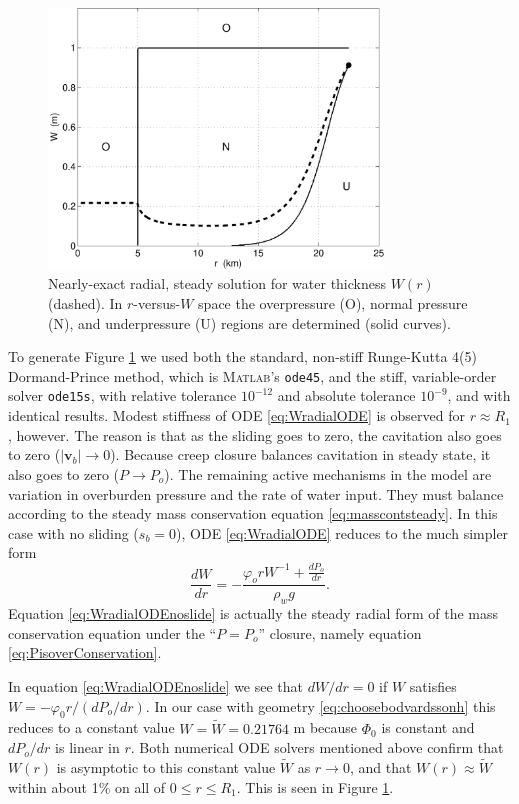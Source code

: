 \documentclass[11pt,final]{amsart}%
\newcommand\bv{\mathbf{v}}
\newcommand\Matlab{\textsc{Matlab}\xspace}
\begin{document}
\begin{figure}[ht]
\includegraphics[width=3.5in,keepaspectratio=true]{figs/exact-W-plot-onu}
\caption{Nearly-exact radial, steady solution for water thickness $W(r)$ (dashed).  In $r$-versus-$W$ space the overpressure (O), normal pressure (N), and underpressure (U) regions are determined (solid curves).}
\label{fig:Wexact}
\end{figure}

To generate Figure \ref{fig:Wexact} we used both the standard, non-stiff Runge-Kutta 4(5) Dormand-Prince method, which is \Matlab's \texttt{ode45}, and the stiff, variable-order solver \texttt{ode15s}, with relative tolerance $10^{-12}$ and absolute tolerance $10^{-9}$, and with identical results.
Modest stiffness \citep{AscherPetzold} of ODE \eqref{eq:WradialODE} is observed for $r\approx R_1$, however.  The reason is that as the sliding goes to zero, the cavitation also goes to zero ($|\bv_b|\to 0$).  Because creep closure balances cavitation in steady state, it also goes to zero ($P\to P_o$).  The remaining active mechanisms in the model are variation in overburden pressure and the rate of water input.  They must balance according to the steady mass conservation equation \eqref{eq:masscontsteady}.  In this case with no sliding ($s_b=0$), ODE \eqref{eq:WradialODE} reduces to the much simpler form
\begin{equation}
\frac{dW}{dr} = - \frac{\varphi_o r W^{-1} + \frac{dP_o}{dr}}{\rho_w g}. \label{eq:WradialODEnoslide}
\end{equation}
Equation \eqref{eq:WradialODEnoslide} is actually the steady radial form of the mass conservation equation under the ``$P=P_o$'' closure, namely equation \eqref{eq:PisoverConservation}.

In equation \eqref{eq:WradialODEnoslide} we see that $dW/dr=0$ if $W$ satisfies $W = - \varphi_0 r / (dP_o/dr)$.  In our case with geometry \eqref{eq:choosebodvardssonh} this reduces to a constant value $W=\tilde W= 0.21764$ m because $\Phi_0$ is constant and $dP_o/dr$ is linear in $r$.  Both numerical ODE solvers mentioned above confirm that $W(r)$ is asymptotic to this constant value $\tilde W$ as $r\to 0$, and that $W(r)\approx \tilde W$ within about 1\% on all of $0\le r \le R_1$.  This is seen in Figure \ref{fig:Wexact}.
\end{document}

